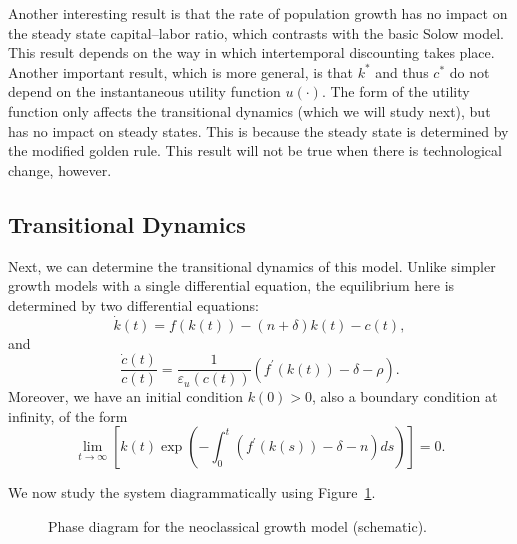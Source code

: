 \documentclass[\topdir/lecture\_notes.tex]{subfiles}
\begin{document}
Another interesting result is that the rate of population growth has no impact on the steady state capital--labor ratio, which contrasts with the basic Solow model. This result depends on the way in which intertemporal discounting takes place. Another important result, which is more general, is that \(k^{*}\) and thus \(c^{*}\) do not depend on the instantaneous utility function \(u(\cdot)\). The form of the utility function only affects the transitional dynamics (which we will study next), but has no impact on steady states. This is because the steady state is determined by the modified golden rule. This result will not be true when there is technological change, however.

\subsection{Transitional Dynamics}
Next, we can determine the transitional dynamics of this model. Unlike simpler growth models with a single differential equation, the equilibrium here is determined by two differential equations:
\[
  \dot{k}(t)=f(k(t))-(n+\delta) k(t)-c(t),
\]
and
\[
  \frac{\dot{c}(t)}{c(t)}=\frac{1}{\varepsilon_{u}(c(t))}\left(f^{\prime}(k(t))-\delta-\rho\right).
\]
Moreover, we have an initial condition \(k(0)>0\), also a boundary condition at infinity, of the form
\[
  \lim _{t \rightarrow \infty}\left[k(t) \exp \left(-\int_{0}^{t}\left(f^{\prime}(k(s))-\delta-n\right) ds\right)\right]=0.
\]

We now study the system diagrammatically using Figure~\ref{fig:phase-diagram}.

\begin{figure}[ht]
  \centering
  \caption{Phase diagram for the neoclassical growth model (schematic).}
  \label{fig:phase-diagram}
\end{figure}
\end{document}
